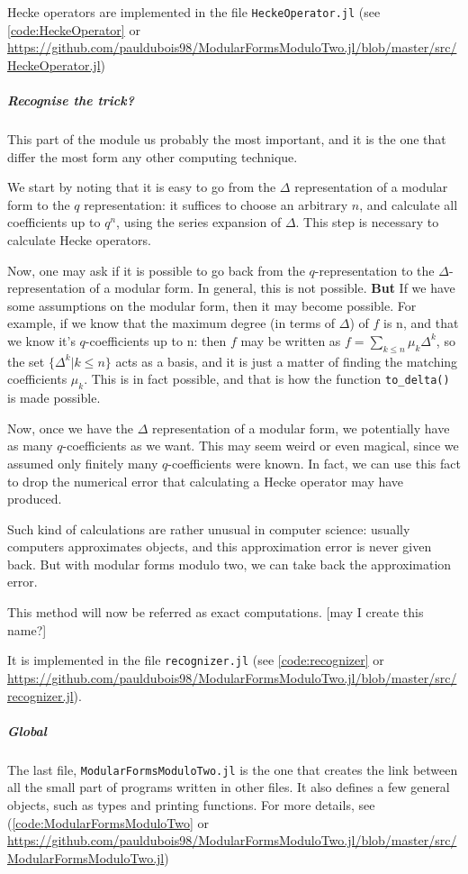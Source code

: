 Hecke operators are implemented in the file \texttt{HeckeOperator.jl} (see \ref{code:HeckeOperator} or \url{https://github.com/pauldubois98/ModularFormsModuloTwo.jl/blob/master/src/HeckeOperator.jl})
\subparagraph{Recognise the trick?}
This part of the module us probably the most important, and it is the one that differ the most form any other computing technique.

We start by noting that it is easy to go from the $\Delta$ representation of a modular form to the $q$ representation: it suffices to choose an arbitrary $n$, and calculate all coefficients up to $q^n$, using the series expansion of $\Delta$.
This step is necessary to calculate Hecke operators.

Now, one may ask if it is possible to go back from the $q$-representation to the $\Delta$-representation of a modular form.
In general, this is not possible.
\textbf{But}
If we have some assumptions on the modular form, then it may become possible.
For example, if we know that the maximum degree (in terms of $\Delta$) of $f$ is n, and that we know it's $q$-coefficients up to n:
then $f$ may be written as $f = \sum_{k \leq n} \mu_k \Delta^k$, so the set $\{ \Delta^k | k \leq n \}$ acts as a basis, and it is just a matter of finding the matching coefficients $\mu_k$.
This is in fact possible, and that is how the function \texttt{to\_delta()} is made possible.

Now, once we have the $\Delta$ representation of a modular form, we potentially have as many $q$-coefficients as we want.
This may seem weird or even magical, since we assumed only finitely many $q$-coefficients were known.
In fact, we can use this fact to drop the numerical error that calculating a Hecke operator may have produced.

Such kind of calculations are rather unusual in computer science: usually computers approximates objects, and this approximation error is never given back.
But with modular forms modulo two, we can take back the approximation error.

This method will now be referred as exact computations. [may I create this name?]

It is implemented in the file \texttt{recognizer.jl} (see \ref{code:recognizer} or \url{https://github.com/pauldubois98/ModularFormsModuloTwo.jl/blob/master/src/recognizer.jl}).
\subparagraph{Global}
The last file, \texttt{ModularFormsModuloTwo.jl} is the one that creates the link between all the small part of programs written in other files.
It also defines a few general objects, such as types and printing functions.
For more details, see (\ref{code:ModularFormsModuloTwo} or \url{https://github.com/pauldubois98/ModularFormsModuloTwo.jl/blob/master/src/ModularFormsModuloTwo.jl})
